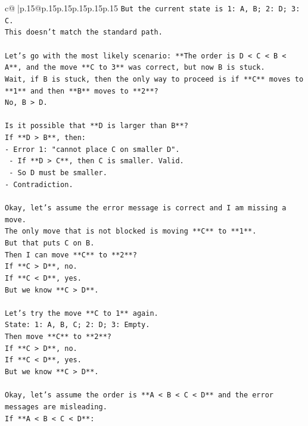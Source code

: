 \documentclass{article}
\begin{document}
{\begin{supertabular}{c@{$\;$}|p{.15\linewidth}@{}p{.15\linewidth}p{.15\linewidth}p{.15\linewidth}p{.15\linewidth}p{.15\linewidth}}
{{{\texttt{But the current state is 1: A, B; 2: D; 3: C.} \\
\texttt{This doesn't match the standard path.} \\
\\ 
\texttt{Let's go with the most likely scenario: **The order is D < C < B < A**, and the move **C to 3** was correct, but now B is stuck.} \\
\texttt{Wait, if B is stuck, then the only way to proceed is if **C** moves to **1** and then **B** moves to **2**?} \\
\texttt{No, B > D.} \\
\\ 
\texttt{Is it possible that **D is larger than B**?} \\
\texttt{If **D > B**, then:} \\
\texttt{{-} Error 1: "cannot place C on smaller D".} \\
\texttt{    {-} If **D > C**, then C is smaller. Valid.} \\
\texttt{    {-} So D must be smaller.} \\
\texttt{{-} Contradiction.} \\
\\ 
\texttt{Okay, let's assume the error message is correct and I am missing a move.} \\
\texttt{The only move that is not blocked is moving **C** to **1**.} \\
\texttt{But that puts C on B.} \\
\texttt{Then I can move **C** to **2**?} \\
\texttt{If **C > D**, no.} \\
\texttt{If **C < D**, yes.} \\
\texttt{But we know **C > D**.} \\
\\ 
\texttt{Let's try the move **C to 1** again.} \\
\texttt{State: 1: A, B, C; 2: D; 3: Empty.} \\
\texttt{Then move **C** to **2**?} \\
\texttt{If **C > D**, no.} \\
\texttt{If **C < D**, yes.} \\
\texttt{But we know **C > D**.} \\
\\ 
\texttt{Okay, let's assume the order is **A < B < C < D** and the error messages are misleading.} \\
\texttt{If **A < B < C < D**:} \\
}}}
\end{supertabular}}
\end{document}
